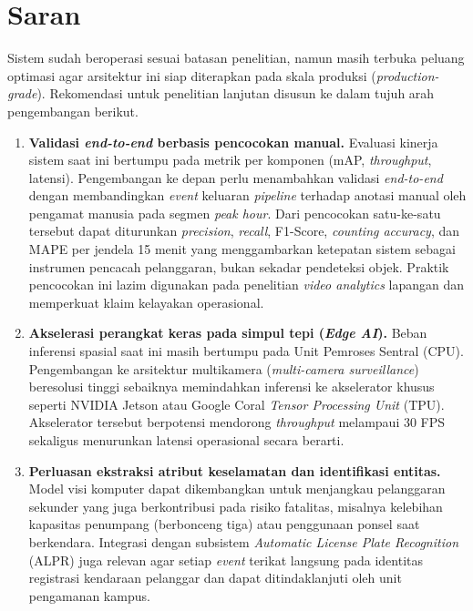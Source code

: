 \section{Saran}
\label{sec:saran}

Sistem sudah beroperasi sesuai batasan penelitian, namun masih terbuka peluang optimasi agar arsitektur ini siap diterapkan pada skala produksi (\textit{production-grade}). Rekomendasi untuk penelitian lanjutan disusun ke dalam tujuh arah pengembangan berikut.

\begin{enumerate}[1.]
  \item \textbf{Validasi \textit{end-to-end} berbasis pencocokan manual.}
    Evaluasi kinerja sistem saat ini bertumpu pada metrik per komponen (mAP, \textit{throughput}, latensi). Pengembangan ke depan perlu menambahkan validasi \textit{end-to-end} dengan membandingkan \textit{event} keluaran \textit{pipeline} terhadap anotasi manual oleh pengamat manusia pada segmen \textit{peak hour}. Dari pencocokan satu-ke-satu tersebut dapat diturunkan \textit{precision}, \textit{recall}, F1-Score, \textit{counting accuracy}, dan MAPE per jendela 15 menit yang menggambarkan ketepatan sistem sebagai instrumen pencacah pelanggaran, bukan sekadar pendeteksi objek. Praktik pencocokan ini lazim digunakan pada penelitian \textit{video analytics} lapangan dan memperkuat klaim kelayakan operasional.

  \item \textbf{Akselerasi perangkat keras pada simpul tepi (\textit{Edge AI}).}
    Beban inferensi spasial saat ini masih bertumpu pada Unit Pemroses Sentral (CPU). Pengembangan ke arsitektur multikamera (\textit{multi-camera surveillance}) beresolusi tinggi sebaiknya memindahkan inferensi ke akselerator khusus seperti NVIDIA Jetson atau Google Coral \textit{Tensor Processing Unit} (TPU). Akselerator tersebut berpotensi mendorong \textit{throughput} melampaui 30 FPS sekaligus menurunkan latensi operasional secara berarti.

  \item \textbf{Perluasan ekstraksi atribut keselamatan dan identifikasi entitas.}
    Model visi komputer dapat dikembangkan untuk menjangkau pelanggaran sekunder yang juga berkontribusi pada risiko fatalitas, misalnya kelebihan kapasitas penumpang (berbonceng tiga) atau penggunaan ponsel saat berkendara. Integrasi dengan subsistem \textit{Automatic License Plate Recognition} (ALPR) juga relevan agar setiap \textit{event} terikat langsung pada identitas registrasi kendaraan pelanggar dan dapat ditindaklanjuti oleh unit pengamanan kampus.


\end{enumerate}
